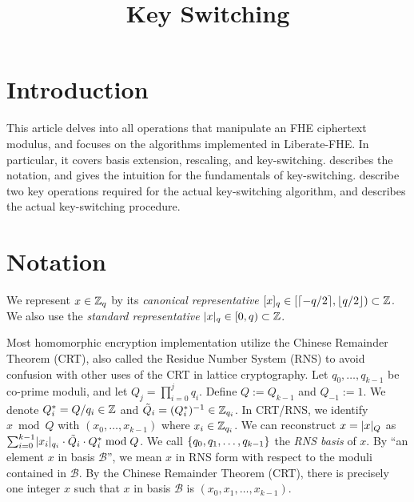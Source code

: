 \documentclass[../fheimpl.tex]{subfiles}
\begin{document}
	\newif\ifksismain
	\ifcompileasbook
	\else
		\hypersetup{pageanchor=false}
		\title{Key Switching}
		\ksismaintrue
		\maketitle
		\listoffixmes
		\tableofcontents
		\compileasbooktrue
		\hypersetup{pageanchor=true}
	\fi

    \section{Introduction}
    This article delves into all operations that manipulate an FHE ciphertext modulus, and focuses on the algorithms implemented in Liberate-FHE. In particular, it covers basis extension, rescaling, and key-switching.  describes the notation, and  gives the intuition for the fundamentals of key-switching.  describe two key operations required for the actual key-switching algorithm, and  describes the actual key-switching procedure.
    
    \section{Notation}
    \label{sec:notation}
    We represent $x\in \mathbb{Z}_q$ by its \emph{canonical representative} $[x]_q \in [\lceil-q/2\rceil, \lfloor q/2\rfloor)\subset\mathbb{Z}$. We also use the \emph{standard representative} $\lvert x\rvert_q \in [0, q)\subset\mathbb{Z}$.
    
    Most homomorphic encryption implementation utilize the Chinese Remainder Theorem (CRT), also called the Residue Number System (RNS) to avoid confusion with other uses of the CRT in lattice cryptography. Let $q_0, \ldots, q_{k-1}$ be co-prime moduli, and let $Q_j=\prod_{i=0}^j q_i$. Define $Q:=Q_{k-1}$ and $Q_{-1}:=1$. We denote $Q_i^* = Q/q_i\in \mathbb{Z}$ and $\tilde{Q}_i=(Q_i^*)^{-1}  \in \mathbb{Z}_{q_i}$. In CRT/RNS, we identify $x\bmod Q$ with $(x_0, \ldots, x_{k-1})$ where $x_i\in\mathbb{Z}_{q_i}$. We can reconstruct $x=\lvert x\rvert_Q$ as $\sum_{i=0}^{k-1}\lvert x_i\rvert_{q_i}\cdot \tilde{Q}_i\cdot Q_i^* \bmod Q$. We call $\{q_0, q_1,\ldots, q_{k-1}\}$ the \emph{RNS basis} of $x$. By ``an element $x$ in basis $\mathcal{B}$'', we mean $x$ in RNS form with respect to the moduli contained in $\mathcal{B}$. By the Chinese Remainder Theorem (CRT), there is precisely one integer $x$ such that $x$ in basis $\mathcal{B}$ is $(x_0, x_1, \ldots, x_{k-1})$. 
    
    
    
    
    
    
    
	\ifksismain
		 \appendix
		 
		 \printbibliography
	\fi
\end{document}
